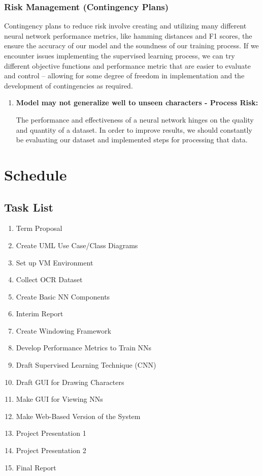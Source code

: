 \documentclass[english,12pt]{article}
\begin{document}
\subsubsection{Risk Management (Contingency Plans)}
Contingency plans to reduce risk involve creating and utilizing many different
neural network performance metrics, like hamming distances and F1 scores, the ensure
the accuracy of our model and the soundness of our training process. If we encounter
issues implementing the supervised learning process, we can try different objective
functions and performance metric that are easier to evaluate and control -- allowing
for some degree of freedom in implementation and the development of contingencies
as required.
\begin{enumerate}[1.]
  \item \textbf{Model may not generalize well to unseen characters - Process Risk:}
  
  The performance and effectiveness of a neural network hinges on the quality and quantity of a dataset. 
  In order to improve results, we should constantly be evaluating our dataset and implemented steps for processing
  that data.
\end{enumerate}

\section{Schedule}

\subsection{Task List}
\begin{enumerate}
    \item Term Proposal
    \item Create UML Use Case/Class Diagrams
    \item Set up VM Environment
    \item Collect OCR Dataset
    \item Create Basic NN Components
    \item Interim Report
    \item Create Windowing Framework
    \item Develop Performance Metrics to Train NNs
    \item Draft Supervised Learning Technique (CNN)
    \item Draft GUI for Drawing Characters
    \item Make GUI for Viewing NNs
    \item Make Web-Based Version of the System
    \item Project Presentation 1
    \item Project Presentation 2
    \item Final Report
\end{enumerate}
\end{document}

